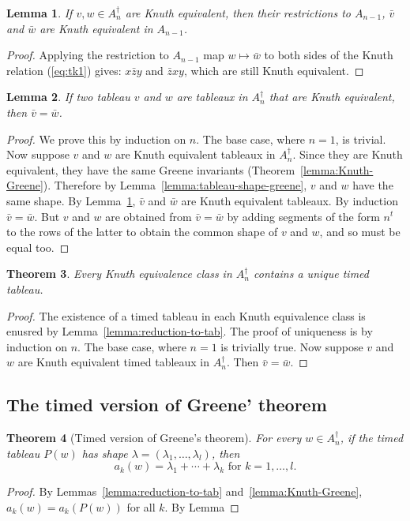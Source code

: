 \documentclass[10pt]{amsproc}
\newtheorem{theorem}{Theorem}[subsection]
\newtheorem{lemma}[theorem]{Lemma}
\theoremstyle{definition}
\theoremstyle{remark}
\begin{document}
\begin{lemma}
  \label{lemma:equivalence-restriction}
  If $v,w\in A_n^\dagger$ are Knuth equivalent, then their restrictions to $A_{n-1}$, $\bar v$ and $\bar w$ are Knuth equivalent in $A_{n-1}$.
\end{lemma}
\begin{proof}
  Applying the restriction to $A_{n-1}$ map $w\mapsto \bar w$ to both sides of the Knuth relation (\ref{eq:tk1}) gives:
  $x\bar z y$ and $\bar z x y$, which are still Knuth equivalent.
\end{proof}
\begin{lemma}
  If two tableau $v$ and $w$ are tableaux in $A_n^\dagger$ that are Knuth equivalent, then $\bar v = \bar w$.
\end{lemma}
\begin{proof}
  We prove this by induction on $n$.
  The base case, where $n=1$, is trivial.
  Now suppose $v$ and $w$ are Knuth equivalent tableaux in $A_n^\dagger$.
  Since they are Knuth equivalent, they have the same Greene invariants (Theorem~\ref{lemma:Knuth-Greene}).
  Therefore by Lemma~\ref{lemma:tableau-shape-greene}, $v$ and  $w$ have the same shape.
  By Lemma~\ref{lemma:equivalence-restriction}, $\bar v$ and $\bar w$ are Knuth equivalent tableaux.
  By induction $\bar v= \bar w$.
  But $v$ and $w$ are obtained from $\bar v=\bar w$ by adding segments of the form $n^t$ to the rows of the latter to obtain the common shape of $v$ and $w$, and so must be equal too.
\end{proof}
\begin{theorem}
  Every Knuth equivalence class in $A_n^\dagger$ contains a unique timed tableau.
\end{theorem}
\begin{proof}
  The existence of a timed tableau in each Knuth equivalence class is enusred by Lemma~\ref{lemma:reduction-to-tab}.
  The proof of uniqueness is by induction on $n$.
  The base case, where $n=1$ is trivially true.
  Now suppose $v$ and $w$ are Knuth equivalent timed tableaux in $A_n^\dagger$.
  Then $\bar v=\bar w$.

\end{proof}
\subsection{The timed version of Greene' theorem}
\label{sec:timed-version-greene}

\begin{theorem}
  [Timed version of Greene's theorem]
  For every $w\in A_n^\dagger$, if the timed tableau $P(w)$ has shape $\lambda=(\lambda_1,\dotsc,\lambda_l)$, then
  \begin{displaymath}
    a_k(w) = \lambda_1+\dotsb+\lambda_k \text{ for $k=1,\dotsc,l$}.
  \end{displaymath}
\end{theorem}
\begin{proof}
  By Lemmas~\ref{lemma:reduction-to-tab} and~\ref{lemma:Knuth-Greene}, $a_k(w)=a_k(P(w))$ for all $k$.
  By Lemma
\end{proof}
\end{document}

